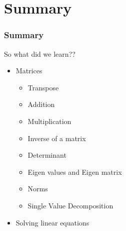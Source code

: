\documentclass[14pt,compress]{beamer}
\begin{document}
\section{Summary}
\begin{frame}
  \frametitle{Summary}
So what did we learn??
  \begin{itemize}
  \item Matrices
    \begin{itemize}
      \item Transpose
      \item Addition
      \item Multiplication
      \item Inverse of a matrix
      \item Determinant
      \item Eigen values and Eigen matrix
      \item Norms
      \item Single Value Decomposition
    \end{itemize}
  \item Solving linear equations
  \end{itemize}
\end{frame}
\end{document}
